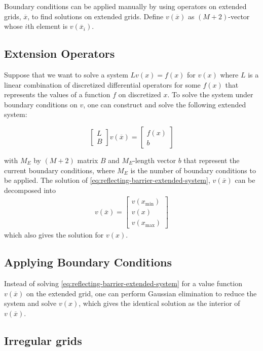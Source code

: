 \documentclass[11pt]{article}
\theoremstyle{definition}
\begin{document}
Boundary conditions can be applied manually by using operators on extended grids, $\overline{x}$, to find solutions on extended grids. Define $v(\overline{x})$ as $(M+2)$-vector whose $i$th element is $v(\overline {x}_i)$.
\subsection{Extension Operators}

Suppose that we want to solve a system $L v({x}) = f(x) $ for $v(x)$ where $L$ is a linear combination of discretized differential operators for some $f(x)$ that represents the values of a function $f$ on discretized $x$. To solve the system under boundary conditions on $v$, one can construct and solve the following extended system:

\begin{equation}\label{eq:reflecting-barrier-extended-system}
\begin{bmatrix}
{L} \\
B
\end{bmatrix}
v(\overline{x}) =
\begin{bmatrix}
f(x) \\
b
\end{bmatrix}
\end{equation}

with $M_E$ by $(M+2)$ matrix $B$ and $M_E$-length vector $b$ that represent the current boundary conditions, where $M_E$ is the number of boundary conditions to be applied. The solution of \eqref{eq:reflecting-barrier-extended-system}, $v(\overline{x})$ can be decomposed into
\begin{align}
v(\overline{x}) = \begin{bmatrix}
v(x_{\min}) \\
v(x) \\
v(x_{\max})
\end{bmatrix}
\end{align}
which also gives the solution for $v(x)$.

\subsection{Applying Boundary Conditions}
Instead of solving \eqref{eq:reflecting-barrier-extended-system} for a value function $v(\overline{x})$ on the extended grid, one can perform Gaussian elimination to reduce the system and solve $v(x)$, which gives the identical solution as the interior of $v(\overline{x})$.


\subsection{Irregular grids}
\end{document}
